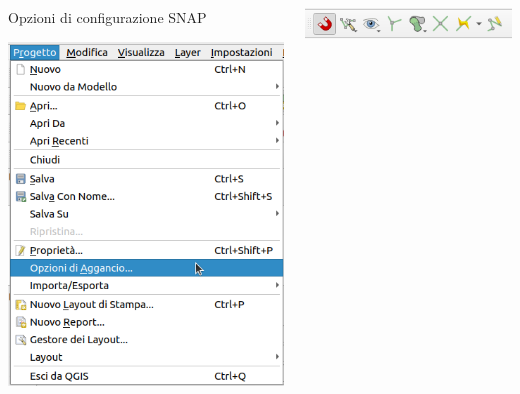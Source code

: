 \documentclass{beamer}
\begin{document}
{\begin{frame}
    \begin{columns}
        \begin{column}{.4\textwidth}
            Opzioni di configurazione SNAP
            \begin{center}
                \includegraphics[width=\textwidth] {digitizing_pics/Opzioni snap del 2022-10-11 16-56-11.png}
            \end{center}
        \end{column}
        \begin{column}{.6\textwidth}
            \begin{center}
                \includegraphics[width=\textwidth] {digitizing_pics/strumenti di snap del 2022-10-11 17-02-02.png}
            \end{center}
            \begin{itemize}

\end{itemize}
\end{column}
\end{columns}
\end{frame}}
\end{document}

